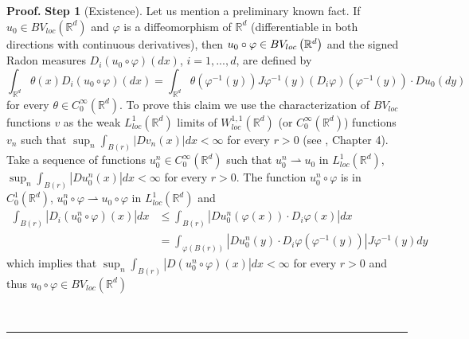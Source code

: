 \documentclass[a4paper,11pt]{article}
\newenvironment{proof}[1][Proof]{\textbf{#1.} }{\ \rule{0.5em}{0.5em}}
\begin{document}
\begin{proof}
\textbf{Step 1} (Existence). Let us mention a preliminary known fact. If $%
u_{0}\in BV_{loc}\left( \mathbb{R}^{d}\right) $ and $\varphi $ is a
diffeomorphism of $\mathbb{R}^{d}$ (differentiable in both directions with
continuous derivatives), then $u_{0}\circ \varphi \in BV_{loc}\left( \mathbb{%
R}^{d}\right) $ and the signed Radon measures $D_{i}\left( u_{0}\circ
\varphi \right) \left( dx\right) $, $i=1,...,d$, are defined by
\begin{equation}
\int_{\mathbb{R}^{d}}\theta \left( x\right) D_{i}\left( u_{0}\circ \varphi
\right) \left( dx\right) =\int_{\mathbb{R}^{d}}\theta \left( \varphi
^{-1}\left( y\right) \right) J\varphi ^{-1}\left( y\right) \left(
D_{i}\varphi \right) \left( \varphi ^{-1}\left( y\right) \right) \cdot
Du_{0}\left( dy\right)   \label{identity BV}
\end{equation}
for every $\theta \in C_{0}^{\infty }\left( \mathbb{R}^{d}\right) $. To
prove this claim we use the characterization of $BV_{loc}$ functions $v$ as
the weak $L_{loc}^{1}\left( \mathbb{R}^{d}\right) $ limits of $%
W_{loc}^{1,1}\left( \mathbb{R}^{d}\right) $ (or $C_{0}^{\infty }(\mathbb{R}%
^{d})$) functions $v_{n}$ such that $\sup_{n}\int_{B\left( r\right) }\left|
Dv_{n}\left( x\right) \right| dx<\infty $ for every $r>0$ (see \cite{GMS},
Chapter 4). Take a sequence of functions $u_{0}^{n}\in C_{0}^{\infty }(%
\mathbb{R}^{d})$ such that $u_{0}^{n}\rightharpoonup u_{0}$ in $%
L_{loc}^{1}\left( \mathbb{R}^{d}\right) $, $\sup_{n}\int_{B\left( r\right)
}\left| Du_{0}^{n}\left( x\right) \right| dx<\infty $ for every $r>0$. The
function $u_{0}^{n}\circ \varphi $ is in $C_{0}^{1}(\mathbb{R}^{d})$, $%
u_{0}^{n}\circ \varphi \rightharpoonup u_{0}\circ \varphi $ in $%
L_{loc}^{1}\left( \mathbb{R}^{d}\right) $ and
\begin{align*}
\int_{B\left( r\right) }\left| D_{i}\left( u_{0}^{n}\circ \varphi \right)
\left( x\right) \right| dx& \leq \int_{B\left( r\right) }\left|
Du_{0}^{n}\left( \varphi \left( x\right) \right) \cdot D_{i}\varphi \left(
x\right) \right| dx \\
& =\int_{\varphi \left( B\left( r\right) \right) }\left| Du_{0}^{n}\left(
y\right) \cdot D_{i}\varphi \left( \varphi ^{-1}\left( y\right) \right)
\right| J\varphi ^{-1}\left( y\right) dy
\end{align*}
which implies that $\sup_{n}\int_{B\left( r\right) }\left| D\left(
u_{0}^{n}\circ \varphi \right) \left( x\right) \right| dx<\infty $ for every
$r>0$ and thus $u_{0}\circ \varphi \in BV_{loc}\left( \mathbb{R}^{d}\right) $%

\end{proof}
\end{document}
